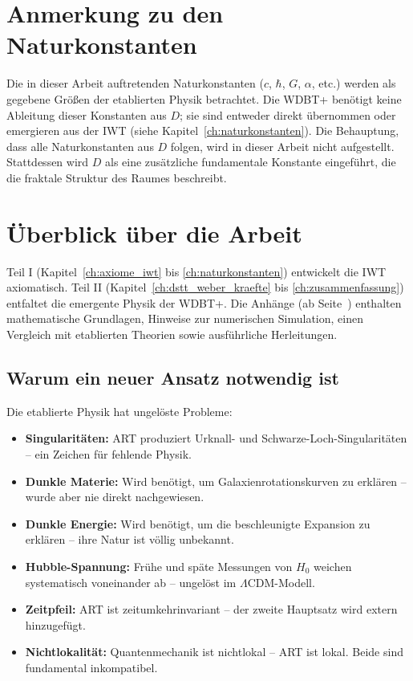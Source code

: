 \section{Anmerkung zu den Naturkonstanten}
\label{sec:naturkonstanten_hinweis}

Die in dieser Arbeit auftretenden Naturkonstanten (\( c \), \( \hbar \), \( G \), \( \alpha \), etc.) werden als gegebene Größen der etablierten Physik betrachtet. Die WDBT+ benötigt keine Ableitung dieser Konstanten aus \( D \); sie sind entweder direkt übernommen oder emergieren aus der IWT (siehe Kapitel~\ref{ch:naturkonstanten}). Die Behauptung, dass alle Naturkonstanten aus \( D \) folgen, wird in dieser Arbeit nicht aufgestellt. Stattdessen wird \( D \) als eine zusätzliche fundamentale Konstante eingeführt, die die fraktale Struktur des Raumes beschreibt.

\section{Überblick über die Arbeit}
\label{sec:ueberblick}

Teil I (Kapitel~\ref{ch:axiome_iwt} bis \ref{ch:naturkonstanten}) entwickelt die IWT axiomatisch. Teil II (Kapitel~\ref{ch:dstt_weber_kraefte} bis \ref{ch:zusammenfassung}) entfaltet die emergente Physik der WDBT+. Die Anhänge (ab Seite~\pageref{app:start}) enthalten mathematische Grundlagen, Hinweise zur numerischen Simulation, einen Vergleich mit etablierten Theorien sowie ausführliche Herleitungen.

\subsection{Warum ein neuer Ansatz notwendig ist}
\label{sub:warum_neu}

Die etablierte Physik hat ungelöste Probleme:

\begin{itemize}
    \item \textbf{Singularitäten:} ART produziert Urknall- und Schwarze-Loch-Singularitäten – ein Zeichen für fehlende Physik.
    \item \textbf{Dunkle Materie:} Wird benötigt, um Galaxienrotationskurven zu erklären – wurde aber nie direkt nachgewiesen.
    \item \textbf{Dunkle Energie:} Wird benötigt, um die beschleunigte Expansion zu erklären – ihre Natur ist völlig unbekannt.
    \item \textbf{Hubble-Spannung:} Frühe und späte Messungen von \(H_0\) weichen systematisch voneinander ab – ungelöst im \(\Lambda\)CDM-Modell.
    \item \textbf{Zeitpfeil:} ART ist zeitumkehrinvariant – der zweite Hauptsatz wird extern hinzugefügt.
    \item \textbf{Nichtlokalität:} Quantenmechanik ist nichtlokal – ART ist lokal. Beide sind fundamental inkompatibel.
\end{itemize}


